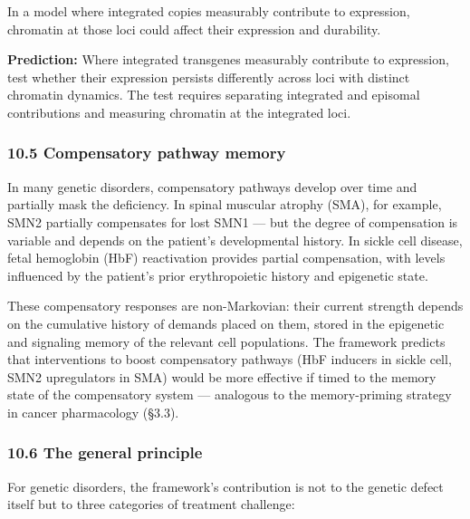 \documentclass[
]{article}
\begin{document}
In a model where integrated copies measurably contribute to expression,
chromatin at those loci could affect their expression and durability.

\textbf{Prediction:} Where integrated transgenes measurably contribute
to expression, test whether their expression persists differently across
loci with distinct chromatin dynamics. The test requires separating
integrated and episomal contributions and measuring chromatin at the
integrated loci.

\hypertarget{compensatory-pathway-memory}{%
\subsubsection{10.5 Compensatory pathway
memory}\label{compensatory-pathway-memory}}

In many genetic disorders, compensatory pathways develop over time and
partially mask the deficiency. In spinal muscular atrophy (SMA), for
example, SMN2 partially compensates for lost SMN1 --- but the degree of
compensation is variable and depends on the patient's developmental
history. In sickle cell disease, fetal hemoglobin (HbF) reactivation
provides partial compensation, with levels influenced by the patient's
prior erythropoietic history and epigenetic state.

These compensatory responses are non-Markovian: their current strength
depends on the cumulative history of demands placed on them, stored in
the epigenetic and signaling memory of the relevant cell populations.
The framework predicts that interventions to boost compensatory pathways
(HbF inducers in sickle cell, SMN2 upregulators in SMA) would be more
effective if timed to the memory state of the compensatory system ---
analogous to the memory-priming strategy in cancer pharmacology (§3.3).

\hypertarget{the-general-principle}{%
\subsubsection{10.6 The general principle}\label{the-general-principle}}

For genetic disorders, the framework's contribution is not to the
genetic defect itself but to three categories of treatment challenge:
\end{document}
